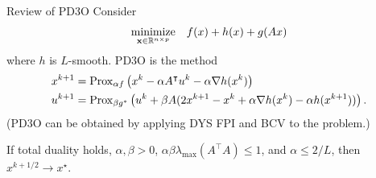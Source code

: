 \documentclass[10pt,mathserif]{beamer}
\begin{document}

\begin{frame}{Review of PD3O}
    Consider
    \[
    \begin{array}{ll}
    \underset{{\mathbf{x}}\in\mathbb{R}^{n\times p}}{\mbox{minimize}} & f(x) + h(x) + g(Ax)
    \end{array}
    \]
    where $h$ is $L$-smooth. PD3O is the method
    \begin{align*}
        x^{k+1} &= \mathrm{Prox}_{\alpha f}\left(x^k - \alpha A^\intercal u^k - \alpha\nabla h(x^k)\right)\\
        u^{k+1} &= \mathrm{Prox}_{\beta g^*}\left(u^k+\beta A(2x^{k+1}-x^k+\alpha\nabla h(x^k)-\alpha h(x^{k+1}))\right).
    \end{align*}
    (PD3O can be obtained by applying DYS FPI and BCV to the problem.)
    \medskip
    
    If total duality holds, $\alpha,\beta>0$, $\alpha\beta\lambda_{\max}(A^\intercal A)\le 1$, and $\alpha\le 2/L$, then $x^{k+1/2}\to x^\star$.
\end{frame}
\end{document}
